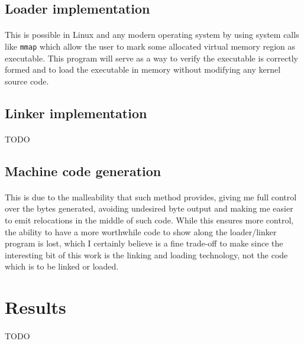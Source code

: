 \documentclass[12pt]{article}
\begin{document}
	\subsection{Loader implementation}
	
	\paragraph{}This is possible in Linux and any modern operating system by using system calls like \verb|mmap| which allow the user to mark some allocated virtual memory region as executable. This program will serve as a way to verify the executable is correctly formed and to load the executable in memory without modifying any kernel source code.
	
	\subsection{Linker implementation}
	
	\paragraph{} TODO
	
	\subsection{Machine code generation}
	
	\paragraph{}This is due to the malleability that such method provides, giving me full control over the bytes generated, avoiding undesired byte output and making me easier to emit relocations in the middle of such code. While this ensures more control, the ability to have a more worthwhile code to show along the loader/linker program is lost, which I certainly believe is a fine trade-off to make since the interesting bit of this work is the linking and loading technology, not the code which is to be linked or loaded.
	
	\section{Results}
	\paragraph{}TODO
	
\end{document}
